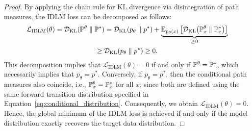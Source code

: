         \begin{proof}
            By applying the chain rule for KL divergence via disintegration of path measures, the IDLM loss can be decomposed as follows:
            \begin{gather}
                \mathcal{L}_{\text{IDLM}}(\theta) = \mathcal{D}_{\text{KL}} (\mathbb{P}^{\theta} \parallel \mathbb{P}^*) = \mathcal{D}_{\text{KL}}(p_{\theta} \parallel p^*) + \underbrace{\mathbb{E}_{p_{\theta}(x)} \left[ \mathcal{D}_{\text{KL}}\big(\mathbb{P}_x^{\theta} \parallel \mathbb{P}_{x}^*\big)\right]}_{\geq 0} \nonumber \\ \geq \mathcal{D}_{\text{KL}}(p_{\theta} \parallel p^*) \geq 0.
            \end{gather}
            This decomposition implies that $\mathcal{L}_{\text{IDLM}}(\theta) = 0$ if and only if $\mathbb{P}^{\theta} = \mathbb{P}^*$, which necessarily implies that $p_{\theta} = p^*$. Conversely, if $p_{\theta} = p^*$, then the conditional path measures also coincide, i.e., $\mathbb{P}^{\theta}_x = \mathbb{P}^{*}_x$ for all $x$, since both are defined using the same forward transition distribution specified in Equation~\eqref{eq:conditional_distribution}. Consequently, we obtain $\mathcal{L}_{\text{IDLM}}(\theta) = 0$. Hence, the global minimum of the IDLM loss is achieved if and only if the model distribution exactly recovers the target data distribution.
        \end{proof}
